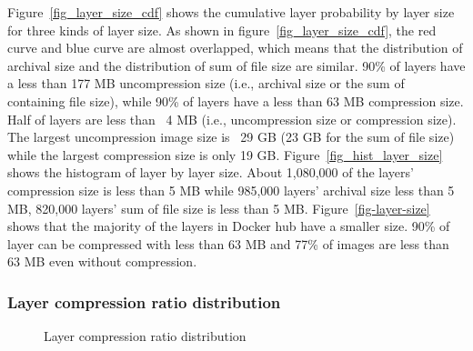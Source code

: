 Figure~\ref{fig_layer_size_cdf} shows the cumulative layer probability by layer size for three kinds of layer size.
As shown in figure~\ref{fig_layer_size_cdf}, the red curve and blue curve are almost overlapped, which means that the distribution of archival size and the distribution of sum of file size are similar. 90\% of layers have a less than 177 MB uncompression size (i.e., archival size or the sum of containing file size), while 90\% of layers have a less than 63 MB compression size. Half of layers are less than ~4 MB (i.e., uncompression size or compression size). The largest uncompression image size is ~29 GB (23 GB for the sum of file size) while the largest compression size is only 19 GB.
Figure~\ref{fig_hist_layer_size} shows the histogram of layer by layer size. About 1,080,000 of the layers' compression size is less than 5 MB while 985,000 layers' archival size less than 5 MB, 820,000 layers' sum of file size is less than 5 MB. 
Figure~\ref{fig-layer-size} shows that the majority of the layers in Docker hub have a smaller size. 90\% of layer can be compressed with less than 63 MB and 77\% of images are less than 63 MB even without compression. 

\subsubsection{Layer compression ratio distribution}

\begin{figure}[!t]
	\centering
	\caption{Layer compression ratio distribution}
	\label{fig-compression-ratio}
\end{figure}

